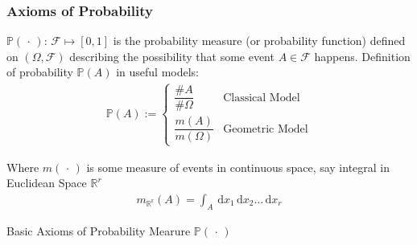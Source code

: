 \subsubsection{Axioms of Probability}

    $\mathbb{P}(\,\cdot\,):\,\mathscr{F}\mapsto [0,1]$ is the probability measure (or probability function) defined on $(\Omega,\mathscr{F})$ describing the possibility that some event $ A\in\mathscr{F}  $ happens. Definition of probability $ \mathbb{P}(A) $ in useful models:
    \begin{align}
       \mathbb{P}\left( A \right) :=\begin{cases}
            \dfrac{\#A}{\#\Omega }&\text{Classical Model}\\
            \dfrac{m(A)}{m(\Omega )}&\text{Geometric Model}
        \end{cases}   
    \end{align}
    
    Where $ m(\, \cdot \, ) $ is some measure of events in continuous space, say integral in Euclidean Space $ \mathbb{R}^r $
    \begin{align}
        m_\mathrm{\mathbb{R}^r}(A)=\int_A \,\mathrm{d}x_1\,\mathrm{d}x_2\ldots\,\mathrm{d}x_r  
    \end{align}
    
    
    
    

    
    
    
\begin{point}
    Basic Axioms of Probability Mearure $ \mathbb{P}(\,\cdot\,) $
\end{point}

